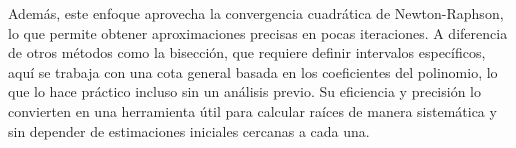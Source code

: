 \begin{homeworkProblem}
\begin{solucion}
\begin{itemize}
  Además, este enfoque aprovecha la convergencia cuadrática de Newton-Raphson, lo que permite obtener aproximaciones precisas en pocas iteraciones. A diferencia de otros métodos como la bisección, que requiere definir intervalos específicos, aquí se trabaja con una cota general basada en los coeficientes del polinomio, lo que lo hace práctico incluso sin un análisis previo. Su eficiencia y precisión lo convierten en una herramienta útil para calcular raíces de manera sistemática y sin depender de estimaciones iniciales cercanas a cada una.
    \end{itemize}
  \end{solucion}
\end{homeworkProblem}
